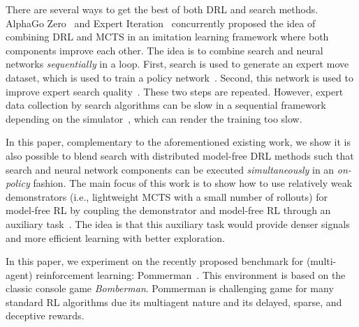 \documentclass[letterpaper]{article} %
\begin{document}
There are several ways to get the best of both DRL and search methods. AlphaGo Zero~\cite{silver2017mastering} and Expert Iteration~\cite{anthony2017thinking} concurrently proposed the idea of combining DRL and MCTS in an imitation learning framework where both components improve each other. The idea is to combine search and neural networks \emph{sequentially} in a loop. First, search is used to generate an expert move dataset, which is used to train a policy network~\cite{guo2014deep}. Second, this network is used to improve expert search quality~\cite{anthony2017thinking}. These two steps are repeated. However, expert data collection by search algorithms can be slow in a sequential framework depending on the simulator~\cite{guo2014deep}, which can render the training too slow.

In this paper, complementary to the aforementioned existing work, we show it is also possible to blend search with distributed model-free DRL methods such that search and neural network components can be executed \emph{simultaneously} in an \textit{on-policy} fashion. The main focus of this work is to show how to use relatively weak demonstrators (i.e., lightweight MCTS with a small number of rollouts) for model-free RL by coupling the demonstrator and model-free RL through an auxiliary task~\cite{jaderberg2016reinforcement}. The idea is that this auxiliary task would provide denser signals and more efficient learning with better exploration.

In this paper, we experiment on the recently proposed benchmark for (multi-agent) reinforcement learning: Pommerman~\cite{resnick2018pommerman}. This environment is based on the classic console game \emph{Bomberman}. Pommerman is  challenging game for many standard RL algorithms due its multiagent nature and its delayed, sparse, and deceptive rewards.
\end{document}
